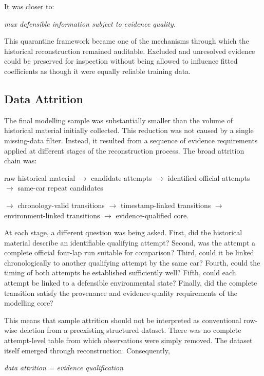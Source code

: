 It was closer to:

\begin{center}\textit{max defensible information subject to evidence quality.}\end{center}

This quarantine framework became one of the mechanisms through which the historical reconstruction remained auditable. Excluded and unresolved evidence could be preserved for inspection without being allowed to influence fitted coefficients as though it were equally reliable training data.

\subsection{Data Attrition}
The final modelling sample was substantially smaller than the volume of historical material initially collected. This reduction was not caused by a single missing-data filter. Instead, it resulted from a sequence of evidence requirements applied at different stages of the reconstruction process. The broad attrition chain was:

raw historical material \ensuremath{\rightarrow} candidate attempts \ensuremath{\rightarrow} identified official attempts \ensuremath{\rightarrow} same-car repeat candidates

\ensuremath{\rightarrow} chronology-valid transitions \ensuremath{\rightarrow} timestamp-linked transitions \ensuremath{\rightarrow} environment-linked transitions \ensuremath{\rightarrow} evidence-qualified core.

At each stage, a different question was being asked. First, did the historical material describe an identifiable qualifying attempt? Second, was the attempt a complete official four-lap run suitable for comparison? Third, could it be linked chronologically to another qualifying attempt by the same car? Fourth, could the timing of both attempts be established sufficiently well? Fifth, could each attempt be linked to a defensible environmental state? Finally, did the complete transition satisfy the provenance and evidence-quality requirements of the modelling core?

This means that sample attrition should not be interpreted as conventional row-wise deletion from a preexisting structured dataset. There was no complete attempt-level table from which observations were simply removed. The dataset itself emerged through reconstruction. Consequently,

\begin{center}\textit{data attrition = evidence qualification}\end{center}

